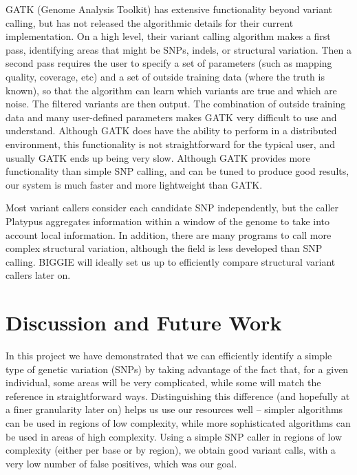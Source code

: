 \documentclass[10pt]{article}
\begin{document}

GATK (Genome Analysis Toolkit) has extensive functionality beyond variant calling, but has not released the algorithmic details for their current implementation. On a high level, their variant calling algorithm makes a first pass, identifying areas that might be SNPs, indels, or structural variation. Then a second pass requires the user to specify a set of parameters (such as mapping quality, coverage, etc) and a set of outside training data (where the truth is known), so that the algorithm can learn which variants are true and which are noise. The filtered variants are then output. The combination of outside training data and many user-defined parameters makes GATK very difficult to use and understand. Although
GATK does have the ability to perform in a distributed environment, this
functionality is not straightforward for the typical user, and usually GATK
ends up being very slow.  Although GATK provides more functionality than simple
SNP calling, and can be tuned to produce good results, our system is much faster and more
lightweight than GATK.

Most variant callers consider each candidate SNP independently, but the caller
Platypus aggregates information within a window of the genome to take into
account local information. In addition, there are many programs to call more
complex structural variation, although the field is less developed than SNP
calling.  BIGGIE will ideally set us up to efficiently compare structural variant callers later on.

\section{Discussion and Future Work}

In this project we have demonstrated that we can efficiently identify a simple type of genetic variation (SNPs) by taking advantage of the fact that, for a given individual, some areas will be very complicated, while some will match the reference in straightforward ways.
Distinguishing this difference (and hopefully at a finer granularity later on) helps us use our resources well -- simpler algorithms can be used in regions of low complexity, while more sophisticated algorithms can be used in areas of high complexity.
Using a simple SNP caller in regions of low complexity (either per base or by region), we obtain good variant calls, with a very low number of false positives, which was our goal. 
\end{document}

